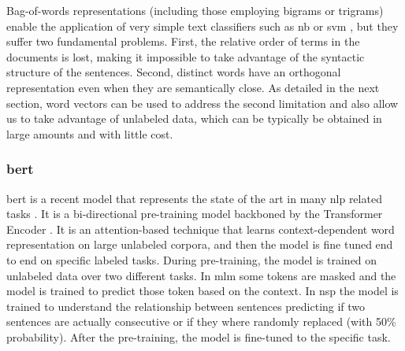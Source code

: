 Bag-of-words representations (including those employing bigrams or
trigrams) enable the application of very simple text classifiers such
as \ac{nb} or \ac{svm} \cite{cortes-support-1995}, but they
suffer two fundamental problems. First, the relative order of terms in
the documents is lost, making it impossible to take advantage of the
syntactic structure of the sentences. Second, distinct words have an
orthogonal representation even when they are semantically
close. As detailed in the next section, word vectors can be used to
address the second limitation and also allow us to take advantage of
unlabeled data, which can be typically be obtained in large amounts
and with little cost.

\subsubsection{\acs{bert}}
\ac{bert} \cite{devlin2018bert} is a recent model that represents the
state of the art in many \ac{nlp} related tasks
\cite{chatterjee2019semeval,hu2019introductory,lee2019biobert,tshitoyan2019unsupervised}.
It is a
bi-directional pre-training model backboned by the Transformer Encoder
\cite{vaswani2017attention}. It is an attention-based technique that
learns context-dependent word representation on large unlabeled
corpora, and then the model is fine tuned end to end on specific labeled
tasks. During pre-training, the model is trained
on unlabeled data over two different tasks. In \ac{mlm} some tokens
are masked and the model is trained to predict those token based on
the context. In \ac{nsp} the model is trained to understand the
relationship between sentences predicting if two sentences are actually
consecutive or if they where randomly replaced (with 50\%
probability). After the pre-training, the model is fine-tuned to the
specific task.


